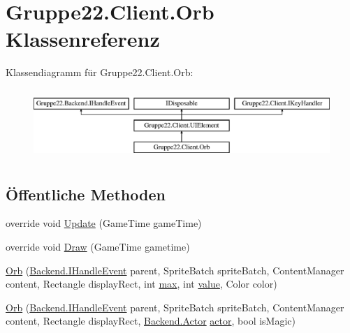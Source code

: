 \hypertarget{class_gruppe22_1_1_client_1_1_orb}{\section{Gruppe22.\-Client.\-Orb Klassenreferenz}
\label{class_gruppe22_1_1_client_1_1_orb}
}
Klassendiagramm für Gruppe22.\-Client.\-Orb\-:\begin{figure}[H]
\begin{center}
\leavevmode
\includegraphics[height=2.692308cm]{class_gruppe22_1_1_client_1_1_orb}
\end{center}
\end{figure}
\subsection*{Öffentliche Methoden}
\begin{DoxyCompactItemize}
\item 
override void \hyperlink{class_gruppe22_1_1_client_1_1_orb_afae90f88a1d08865e47dd12413065fd4}{Update} (Game\-Time game\-Time)
\item 
override void \hyperlink{class_gruppe22_1_1_client_1_1_orb_a4254f678d8562401de35e0b285989958}{Draw} (Game\-Time gametime)
\item 
\hyperlink{class_gruppe22_1_1_client_1_1_orb_a956efd30e2eafc4e331bd663ff000a8d}{Orb} (\hyperlink{interface_gruppe22_1_1_backend_1_1_i_handle_event}{Backend.\-I\-Handle\-Event} parent, Sprite\-Batch sprite\-Batch, Content\-Manager content, Rectangle display\-Rect, int \hyperlink{class_gruppe22_1_1_client_1_1_orb_ab6d555ddf688d3bb1faae3e6a2f6dfed}{max}, int \hyperlink{class_gruppe22_1_1_client_1_1_orb_a7ed4893141f482fed4ec625869b87802}{value}, Color color)
\item 
\hyperlink{class_gruppe22_1_1_client_1_1_orb_ab8bf19b97304155601e7ad8e55bf3a96}{Orb} (\hyperlink{interface_gruppe22_1_1_backend_1_1_i_handle_event}{Backend.\-I\-Handle\-Event} parent, Sprite\-Batch sprite\-Batch, Content\-Manager content, Rectangle display\-Rect, \hyperlink{class_gruppe22_1_1_backend_1_1_actor}{Backend.\-Actor} \hyperlink{class_gruppe22_1_1_client_1_1_orb_a4e41fb8ca80e0e571c81667475c43d70}{actor}, bool is\-Magic)
\end{DoxyCompactItemize}
